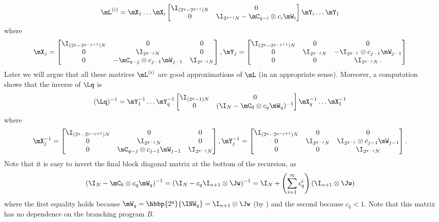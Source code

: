 \begin{equation}
    \mL^{(i)}=\mX_1\dots \mX_i\begin{bmatrix}\I_{(2^q-2^{q-i})N} & 0\\ 0 & \I_{2^{q-i}N}-\mC_{q-i}\otimes c_i\mW_i\end{bmatrix}\mY_i\dots \mY_1 \label{eqn:Lq}%
\end{equation}
%
where %
\[\mX_j=\begin{bmatrix} \I_{(2^q-2^{q-j+1})N} & 0 & 0\\
0 & \I_{2^{q-j}N} & 0\\
0 & -\mC_{q-j}\otimes c_{j-1}\mW_{j-1} & \I_{2^{q-j}N}
\end{bmatrix},\\
\mY_j=\begin{bmatrix} \I_{(2^q-2^{q-j+1})N} & 0 & 0\\
0 & \I_{2^{q-j}N} & -\I_{2^{q-j}}\otimes c_{j-1}\mW_{j-1}\\
0 & 0 & \I_{2^{q-j}N}\,. %
\end{bmatrix}\]
Later we will argue that all these matrices $\mL^{(i)}$%
are good approximations of $\mL$ (in an appropriate sense). Moreover, 
a computation shows that the inverse of $\Lq$ is
%
\begin{equation}\label{eqn:Lqinv}
    (\Lq)^{-1} = \mY_1^{-1}\dots \mY_q^{-1}\begin{bmatrix}\I_{(2^q-1)N} & 0\\ 0 & (\I_{N}-\mC_{0}\otimes c_q \mW_q)^{-1}\end{bmatrix}\mX_q^{-1}\dots \mX_1^{-1}%
\end{equation}
%
where %
\[\mX_j^{-1}=\begin{bmatrix} \I_{(2^q-2^{q-j+1})N} & 0 & 0\\
0 & \I_{2^{q-j}N} & 0\\
0 & \mC_{q-j}\otimes c_{j-1}\mW_{j-1} & \I_{2^{q-j}N}
\end{bmatrix}, 
\mY_j^{-1}=\begin{bmatrix} \I_{(2^q-2^{q-j+1})N} & 0 & 0\\
0 & \I_{2^{q-j}N} & \I_{2^{q-j}}\otimes c_{j-1}\mW_{j-1}\\
0 & 0 & \I_{2^{q-j}N}
\end{bmatrix}.\]
Note that it is easy to invert the final block diagonal matrix at the bottom of the recursion, as
$$(\I_{N}-\mC_{0}\otimes c_q \mW_q)^{-1}=(\I_N-c_q\I_{n+1}\otimes \Jw)^{-1}=\I_N+\left(\sum_{i=1}^\infty c_q^i\right)(\I_{n+1}\otimes \Jw)$$ 
where the first equality holds because $\mW_q = \hbbp{2^q}{\INW_q}=\I_{n+1}\otimes\Jw$ (by ) and the second because $c_q<1$. Note that this matrix has no dependence on the branching program $B$.

